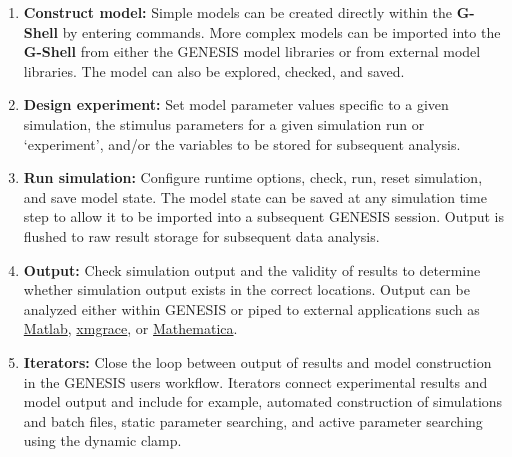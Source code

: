 \documentclass[12pt]{article}
\begin{document}
\begin{enumerate}

\item {\bf Construct model:} Simple models can be created directly within the {\bf G-Shell} by entering commands. More complex models can be imported into the {\bf G-Shell} from either the GENESIS model libraries or from external model libraries. The model can also be explored, checked, and saved.

\item {\bf Design experiment:}  Set model parameter values specific to a given simulation, the stimulus parameters for a given simulation run or  `experiment', and/or the variables to be stored for subsequent analysis.

\item  {\bf Run simulation:} Configure runtime options, check, run, reset simulation, and save model state. The model state can be saved at any simulation time step to allow it to be imported into a subsequent GENESIS session. Output is flushed to raw result storage for subsequent data analysis. 

\item {\bf Output:}  Check simulation output and the validity of results to determine whether simulation output exists in the correct locations. Output can be analyzed either within GENESIS or piped to external applications such as \href{http://www.mathworks.com/}{Matlab}, \href{http://www.mathworks.com/}{xmgrace}, or \href{http://www.wolfram.com/}{Mathematica}.

\item {\bf Iterators:} Close the loop between output of results and model construction in the GENESIS users workflow. Iterators connect experimental results and model output and include for example, automated construction of simulations and batch files, static parameter searching, and active parameter searching using the dynamic clamp. 

\end{enumerate}
\end{document}
